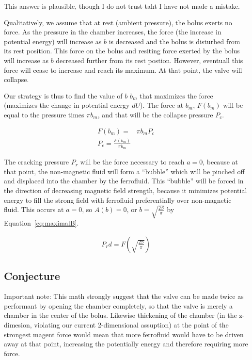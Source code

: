 \documentclass[]{asme2ej}
\begin{document}
This answer is plausible, though I do not trust taht I have not made a mistake.





Qualitatively, we assume that at rest (ambient pressure), the bolus exerts no force. As the
pressure in the chamber increases, the force (the increase in potential energy) will increase
as $b$ is decreased and the bolus is disturbed from its rest position. This force on the
bolus and resiting force exerted by the bolus will increase
as $b$ decreased further from its rest postion. However, eventuall this force will cease to
increase and reach its maximum. At that point, the valve will collapse.

Our strategy is thus to find the value of $b$ $b_m$ that maximizes the force (maximizes the change in
potential energy $dU$). The force at $b_m$, $F(b_m)$ will be equal to the pressure times $\pi b_m$, and
that will be the collapse pressure $P_c$.

\begin{align}
  F(b_m) = & \pi b_m P_c \\
  P_c = \frac{F(b_m)}{\pi b_m}
\end{align}

The cracking pressure $P_r$ will be the force necessary to reach $a = 0$, because at that point,
the non-magnetic fluid will form a ``bubble'' which will be pinched off and displaced into the chamber
by the ferrofluid. This ``bubble'' will be forced in the direction of decreasing magnetic field strength,
because it minimizes potential energy to fill the strong field with ferrofluid preferentially over
non-magnetic fluid. This occurs at $a = 0$, so $A(b) = 0$, or $b = \sqrt{\frac{2S}{\pi}}$ by Equation~\ref{eq:maximalB}.

\begin{align}
  P_r d = F(\sqrt{\frac{2S}{\pi}})
\end{align}


\subsection{Conjecture}

Important note: This math strongly suggest that the valve can be
made twice as performant by opening the chamber completely, so that the
valve is merely a chamber in the center of the bolus.
Likewise thickening of the chamber (in the z-dimesion, violating
our current 2-dimensional assuption) at the point of the strongest
magent force would mean that more ferrofluid would have to be driven
away at that point, increasing the potentially energy and therefore
requiring more force.
\end{document}
